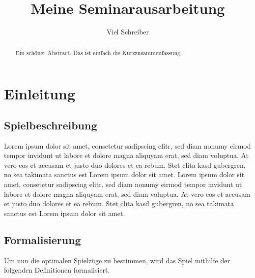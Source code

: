 \documentclass[a4paper,12pt]{llncs}
\numberwithin{equation}{section}
\begin{document}


\author{Viel Schreiber}

\title{Meine Seminarausarbeitung}

\maketitle

\thispagestyle{empty}

\begin{abstract}
Ein schöner Abstract. Das ist einfach die Kurzzusammenfassung.
\end{abstract}

\section{Einleitung}
\subsection{Spielbeschreibung}
Lorem ipsum dolor sit amet, consetetur sadipscing elitr, sed diam nonumy eirmod tempor invidunt ut labore et dolore magna aliquyam erat, sed diam voluptua. At vero eos et accusam et justo duo dolores et ea rebum. Stet clita kasd gubergren, no sea takimata sanctus est Lorem ipsum dolor sit amet. Lorem ipsum dolor sit amet, consetetur sadipscing elitr, sed diam nonumy eirmod tempor invidunt ut labore et dolore magna aliquyam erat, sed diam voluptua. At vero eos et accusam et justo duo dolores et ea rebum. Stet clita kasd gubergren, no sea takimata sanctus est Lorem ipsum dolor sit amet.

\subsection{Formalisierung}
Um nun die optimalen Spielzüge zu bestimmen, wird das Spiel mithilfe der folgenden Definitionen formalisiert.
\end{document}
